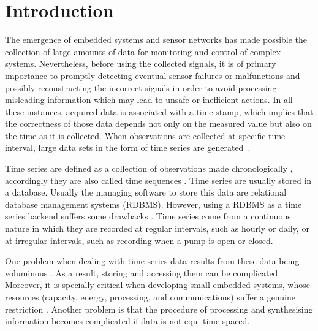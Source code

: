 \section{Introduction}


The emergence of embedded
systems and sensor networks has made possible the collection of large
amounts of data for monitoring and control of complex systems.
%
Nevertheless, before using the collected signals, it is of primary
importance to promptly detecting eventual sensor failures or
malfunctions and possibly reconstructing the incorrect signals in
order to avoid processing misleading information which may lead to
unsafe or inefficient actions.  In all these instances, acquired data
is associated with a time stamp, which implies that the correctness of
those data depends not only on the measured value but also on the time
as it is collected. When observations are collected at specific time
interval, large data sets in the form of time series are
generated~\cite{basu07:_autom}.  

Time series are defined as a collection of observations made
chronologically \cite{fu11}, accordingly they are also called time
sequences \cite{last:hetland}.  Time series are usually stored in a
database. Usually the managing software to store this data are
relational database management systems (RDBMS). However, using a RDBMS
as a time series backend suffers some drawbacks
\cite{dreyer94,schmidt95,stonebraker09:scidb,zhang11}. Time series
come from a continuous nature in which they are recorded at regular
intervals, such as hourly or daily, or at irregular intervals, such as
recording when a pump is open or closed.

One problem when dealing with time series data results from these data
being voluminous \cite{fu11}. As a result, storing and accessing
them can be complicated. Moreover, it is specially critical when
developing small embedded systems, whose resources (capacity, energy,
processing, and communications) suffer a genuine restriction
\cite{yaogehrke02}.  Another problem is that the procedure of
processing and synthesising information becomes complicated if data is
not equi-time spaced.



